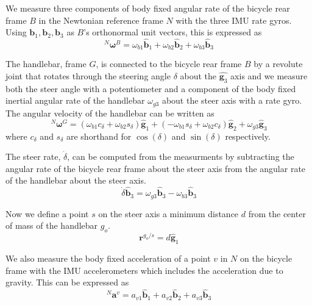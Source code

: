 \documentclass[10pt]{article}
\begin{document}
We measure three components of body fixed angular rate of the bicycle rear
frame $B$ in the Newtonian reference frame $N$ with the three IMU rate gyros.
Using $\mathbf{b}_{1},\mathbf{b}_{2},\mathbf{b}_{3}$ as $B$'s orthonormal unit
vectors, this is expressed as
%
\begin{equation}
  ^N\boldsymbol{\omega}^B = \omega_{b1}\hat{\mathbf{b}}_1 +
                            \omega_{b2}\hat{\mathbf{b}}_2 +
                            \omega_{b3}\hat{\mathbf{b}}_3
  \label{eq:rear-frame-angular-rate}
\end{equation}

The handlebar, frame $G$, is connected to the bicycle rear frame $B$ by a
revolute joint that rotates through the steering angle $\delta$ about the
$\hat{\mathbf{g}_3}$ axis and we measure both the steer angle with a
potentiometer and a component of the body fixed inertial angular rate of the
handlebar $\omega_{g3}$ about the steer axis with a rate gyro. The angular
velocity of the handlebar can be written as
%
\begin{equation}
  ^N\boldsymbol{\omega}^G =
    (\omega_{b1}c_\delta + \omega_{b2}s_\delta)\hat{\mathbf{g}}_1 +
    (-\omega_{b1}s_\delta + \omega_{b2}c_\delta)\hat{\mathbf{g}}_2 +
    \omega_{g3}\hat{\mathbf{g}}_3
\end{equation}
%
where $c_\delta$ and $s_\delta$ are shorthand for $\operatorname{cos}(\delta)$
and $\operatorname{sin}(\delta)$ respectively.

The steer rate, $\dot{\delta}$, can be computed from the measurments by
subtracting the angular rate of the bicycle rear frame about the steer axis
from the angular rate of the handlebar about the steer axis.
%
\begin{equation}
  \dot{\delta} \hat{\mathbf{b}}_3 = \omega_{g3} \hat{\mathbf{b}}_3 - \omega_{b3} \hat{\mathbf{b}}_3
\end{equation}

Now we define a point $s$ on the steer axis a minimum distance $d$ from the
center of mass of the handlebar $g_o$.
%
\begin{equation}
  \mathbf{r}^{g_o/s} = d\hat{\mathbf{g}}_1
\end{equation}

We also measure the body fixed acceleration of a point $v$ in $N$ on the
bicycle frame with the IMU accelerometers which includes the acceleration due
to gravity. This can be expressed as
%
\begin{equation}
  ^N\mathbf{a}^v =
    a_{v1}\hat{\mathbf{b}}_1 +
    a_{v2}\hat{\mathbf{b}}_2 +
    a_{v3}\hat{\mathbf{b}}_3
  \label{eq:acceleration-of-v}
\end{equation}
\end{document}
